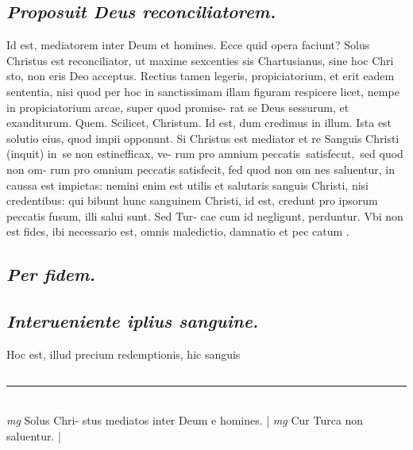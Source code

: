 \documentclass{article}
\begin{document}
\begin{pages}
\subsection*{\textit{Proposuit Deus reconciliatorem. }}\pstart Id est, mediatorem inter Deum et homines. Ecce quid opera faciunt? Solus Christus est reconciliator, ut maxime sexcenties sis Chartusianus, sine hoc Chri sto, non eris Deo acceptus. Rectius tamen legeris, propiciatorium, et erit eadem sententia, nisi quod per hoc in sanctissimam illam figuram respicere licet, nempe in propiciatorium arcae, super quod promise- rat se Deus sessurum, et exauditurum.   \pend\pstart Quem. Scilicet, Christum.  \pend\pstart Id est, dum credimus in illum. Ista est solutio eius, quod impii opponunt. Si Christus est mediator et re Sanguis Christi (inquit) in se non estinefficax, ve- rum pro amnium peccatis satisfecut, sed quod non om- rum pro omnium peccatis satisfecit, fed quod non om nes saluentur, in caussa est impietas: nemini enim est utilis et salutaris sanguis Christi, nisi credentibus: qui bibunt hunc sanguinem Christi, id est, credunt pro ipsorum peccatis fusum, illi salui sunt. Sed Tur- cae cum id negligunt, perduntur. Vbi non est fides, ibi necessario est, omnis maledictio, damnatio et pec catum .   \pend
{}
{}
\subsection*{\textit{Per fidem. }}
{}
\subsection*{\textit{Interueniente iplius sanguine. }}\pstart Hoc est, illud precium redemptionis, hic sanguis  \pend
{}
{}
\subsection*{\textit{}}
\vspace{0.5cm}\noindent
\vspace{0.2cm}\rule{1cm}{0.2pt}\\ 
\hspace{0.2cm}\textit{mg}
\footnotesize Solus Chri- stus mediatos inter Deum e homines. 
\normalsize| 
\hspace{0.2cm}\textit{mg}
\footnotesize Cur Turca non saluentur. 
\normalsize| 

\end{pages}
\end{document}
